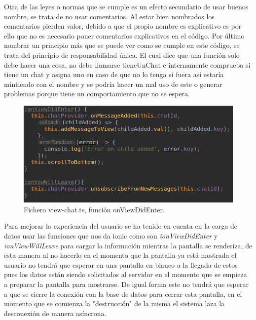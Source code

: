 Otra de las leyes o normas que se cumple es un efecto secundario de usar
buenos nombre, se trata de no usar comentarios. Al estar bien nombrados
los comentarios pierden valor, debido a que el propio nombre es explicativo
es por ello que no es necesario poner comentarios explicativos en el código.
Por último nombrar un principio más que se puede ver como se cumple en este
código, se trata del principio de responsabilidad única. El cual dice
que una función solo debe hacer una cosa, no debe llamarse tieneUnChat e
internamente comprueba si tiene un chat y asigna uno en caso de que no lo tenga
si fuera así estaría mintiendo con el nombre y se podría hacer un mal uso de este
o generar problemas porque tiene un comportamiento que no se espera.

\begin{figure}
    \includegraphics[width=\linewidth]{./images/code/view-chat-ts-onViewDidEnter.png}
    \caption{Fichero view-chat.ts, función onViewDidEnter.}
    \label{view-chat.ts}
\end{figure}
\medskip
Para mejorar la experiencia del usuario se ha tenido en cuenta en la carga
de datos usar las funciones que nos da ionic como son \textit{ionViewDidEnter}
y \textit{ionViewWillLeave} para cargar la información mientras la pantalla
se renderiza, de esta manera al no hacerlo en el momento que la pantalla
ya está mostrada el usuario no tendrá que esperar en una pantalla en blanco
a la llegada de estos pues los datos están siendo solicitados al servidor
en el momento que se empieza a preparar la pantalla para mostrarse. De igual
forma este no tendrá que esperar a que se cierre la conexión con la base de
datos para cerrar esta pantalla, en el momento que se comienza la "destrucción"
de la misma el sistema laza la desconexión de manera asíncrona.